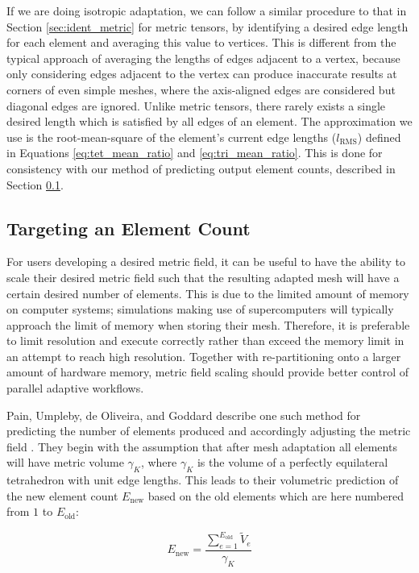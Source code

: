 If we are doing isotropic adaptation, we can follow a
similar procedure to that in Section \ref{sec:ident_metric} for metric tensors,
by identifying a desired edge length for each element and averaging
this value to vertices.
This is different from the typical approach of averaging the lengths of edges
adjacent to a vertex, because only considering edges adjacent to the vertex
can produce inaccurate results at corners of even simple meshes, where the
axis-aligned edges are considered but diagonal edges are ignored.
Unlike metric tensors, there rarely exists a single desired length which is
satisfied by all edges of an element.
The approximation we use is the root-mean-square of the element's current
edge lengths ($l_{\text{RMS}}$) defined in Equations \ref{eq:tet_mean_ratio}
and \ref{eq:tri_mean_ratio}.
This is done for consistency with our method of predicting output element counts,
described in Section \ref{sec:elem_count}.

\subsection{Targeting an Element Count}
\label{sec:elem_count}

For users developing a desired metric field, it can be useful
to have the ability to scale their desired metric field such
that the resulting adapted mesh will have a certain desired number
of elements.
This is due to the limited amount of memory on computer systems;
simulations making use of supercomputers will typically approach
the limit of memory when storing their mesh.
Therefore, it is preferable to limit resolution and execute correctly
rather than exceed the memory limit in an attempt to reach high resolution.
Together with re-partitioning onto a larger amount of hardware memory,
metric field scaling should provide better control of parallel adaptive
workflows.

Pain, Umpleby, de Oliveira, and Goddard describe one such method for
predicting the number of elements produced and accordingly adjusting
the metric field \cite{pain2001tetrahedral}.
They begin with the assumption that after mesh adaptation all elements
will have metric volume $\gamma_K$, where $\gamma_K$ is the volume of
a perfectly equilateral tetrahedron with unit edge lengths.
This leads to their volumetric prediction of the new element count
$E_\text{new}$ based on the old elements which are here
numbered from $1$ to $E_\text{old}$:

\begin{equation}
E_{\text{new}} = \frac{\sum_{e=1}^{E_{\text{old}}} \tilde{V}_e}{\gamma_K}
\end{equation}


